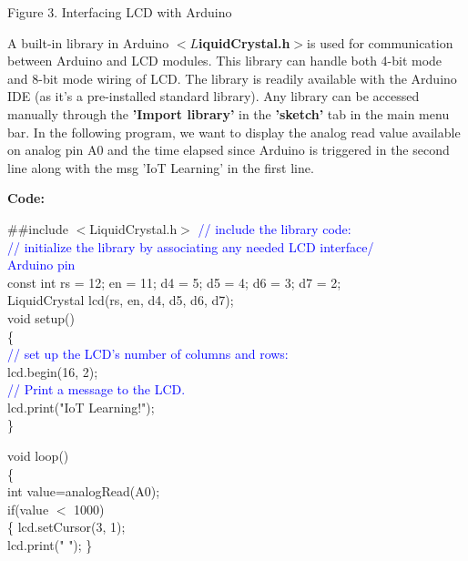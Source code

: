 \documentclass[12pt,a4paper]{article}
\begin{document}
\begin{justify}
\begin{center} {Figure 3. Interfacing LCD with Arduino}\end{center}

\noindent A built-in library in Arduino \textbf{$<L$iquidCrystal.h$>$}is used for communication between Arduino and LCD modules. This library can handle both 4-bit mode and 8-bit mode wiring of LCD. The library is readily available with the Arduino IDE (as it’s a pre-installed standard library).  Any library can be accessed manually through the \textbf{'Import library'} in the \textbf{'sketch'} tab in the main menu bar.
In the following program, we want to display the analog read value available on analog pin A0 and the time elapsed since Arduino is triggered in the second line along with the msg 'IoT Learning' in the first line. \end{justify}

\hspace{2cm}\textbf{\large Code:}\\[6pt]


\setlength{\parindent}{10eM}

\##include $<$LiquidCrystal.h$>$  \textcolor{blue}{// include the library code:\\
// initialize the library by associating any needed LCD interface/ \\ Arduino pin}\\

const int rs = 12; en = 11; d4 = 5; d5 = 4; d6 = 3; d7 = 2;\\
LiquidCrystal lcd(rs, en, d4, d5, d6, d7);\\

void setup()\\ 
\{\\	
\textcolor{blue}{// set up the LCD's number of columns and rows:}\\
lcd.begin(16, 2);\\
\textcolor{blue}{// Print a message to the LCD.}\\
lcd.print("IoT Learning!");\\
\}

void loop() \\
\{  \\ 
  int value=analogRead(A0);\\

   if(value $<$ 1000)\\
  \{ lcd.setCursor(3, 1);\\
    lcd.print(" "); \}\\
\end{document}
